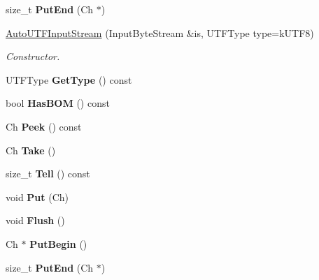 \begin{DoxyCompactItemize}
\item 
size\+\_\+t {\bfseries Put\+End} (Ch $\ast$)\hypertarget{class_auto_u_t_f_input_stream_a41bd66602f82d344383792feac34f9f7}{}\label{class_auto_u_t_f_input_stream_a41bd66602f82d344383792feac34f9f7}

\item 
\hyperlink{class_auto_u_t_f_input_stream_a83837fced0971ba26dd9a8ec1575abb0}{Auto\+U\+T\+F\+Input\+Stream} (Input\+Byte\+Stream \&is, U\+T\+F\+Type type=k\+U\+T\+F8)
\begin{DoxyCompactList}\small\item\em Constructor. \end{DoxyCompactList}\item 
U\+T\+F\+Type {\bfseries Get\+Type} () const \hypertarget{class_auto_u_t_f_input_stream_a4b8a3fa5d465a98ec93373cc88102d34}{}\label{class_auto_u_t_f_input_stream_a4b8a3fa5d465a98ec93373cc88102d34}

\item 
bool {\bfseries Has\+B\+OM} () const \hypertarget{class_auto_u_t_f_input_stream_a74bf5085aaefeb533cbe31719cb0be23}{}\label{class_auto_u_t_f_input_stream_a74bf5085aaefeb533cbe31719cb0be23}

\item 
Ch {\bfseries Peek} () const \hypertarget{class_auto_u_t_f_input_stream_a091e55c06a8013b978c9bab05c9068e3}{}\label{class_auto_u_t_f_input_stream_a091e55c06a8013b978c9bab05c9068e3}

\item 
Ch {\bfseries Take} ()\hypertarget{class_auto_u_t_f_input_stream_a652cd1ae8bd848a5ecce4efa1ebd0f38}{}\label{class_auto_u_t_f_input_stream_a652cd1ae8bd848a5ecce4efa1ebd0f38}

\item 
size\+\_\+t {\bfseries Tell} () const \hypertarget{class_auto_u_t_f_input_stream_a759b3d2690679ff9eef0c18cb2fbb0cf}{}\label{class_auto_u_t_f_input_stream_a759b3d2690679ff9eef0c18cb2fbb0cf}

\item 
void {\bfseries Put} (Ch)\hypertarget{class_auto_u_t_f_input_stream_a5ea730d1ab715f58ce4f9e3dcd77810a}{}\label{class_auto_u_t_f_input_stream_a5ea730d1ab715f58ce4f9e3dcd77810a}

\item 
void {\bfseries Flush} ()\hypertarget{class_auto_u_t_f_input_stream_aecc08f52794d761fc1b729907a83dcf8}{}\label{class_auto_u_t_f_input_stream_aecc08f52794d761fc1b729907a83dcf8}

\item 
Ch $\ast$ {\bfseries Put\+Begin} ()\hypertarget{class_auto_u_t_f_input_stream_a761841842c147c0bb1a69bfacbc117a2}{}\label{class_auto_u_t_f_input_stream_a761841842c147c0bb1a69bfacbc117a2}

\item 
size\+\_\+t {\bfseries Put\+End} (Ch $\ast$)\hypertarget{class_auto_u_t_f_input_stream_a41bd66602f82d344383792feac34f9f7}{}\label{class_auto_u_t_f_input_stream_a41bd66602f82d344383792feac34f9f7}

\end{DoxyCompactItemize}


